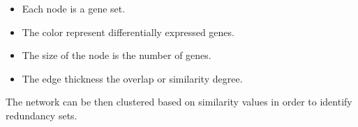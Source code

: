 		\begin{itemize}
			\item Each node is a gene set.
			\item The color represent differentially expressed genes.
			\item The size of the node is the number of genes.
			\item The edge thickness the overlap or similarity degree.
		\end{itemize}
	
	The network can be then clustered based on similarity values in order to identify redundancy sets.
